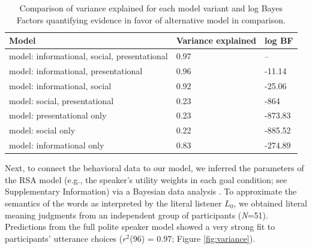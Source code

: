 \documentclass[9pt,twocolumn,twoside,lineno]{main_class_file}
\begin{document}
\begin{table}[tbp]
\begin{center}
\begin{threeparttable}
\caption{\label{tab:comparisonTable}Comparison of variance explained for each model variant and log Bayes Factors quantifying evidence in favor of alternative model in comparison.}
\begin{tabular}{lll}
\toprule
Model & \multicolumn{1}{c}{Variance 
explained} & \multicolumn{1}{c}{log BF}\\
\midrule
model: 
informational, 
social, 
presentational & 0.97 & --\\
model: 
informational, 
presentational & 0.96 & -11.14\\
model: 
informational, 
social & 0.92 & -25.06\\
model: 
social, 
presentational & 0.23 & -864\\
model: 
presentational 
only & 0.23 & -873.83\\
model: 
social only & 0.22 & -885.52\\
model: 
informational 
only & 0.83 & -274.89\\
\bottomrule
\end{tabular}
\end{threeparttable}
\end{center}
\end{table}

Next, to connect the behavioral data to our model, we inferred the
parameters of the RSA model (e.g., the speaker's utility weights in each
goal condition; see Supplementary Information) via a Bayesian data
analysis \cite{lee2014}. To approximate the semantics
of the words as interpreted by the literal listener \(L_0\), we obtained
literal meaning judgments from an independent group of participants
(\emph{N}=51). Predictions from the full polite speaker model showed a
very strong fit to participants' utterance choices (\(r^2\)(96) = 0.97;
Figure \ref{fig:variance}).
\end{document}
